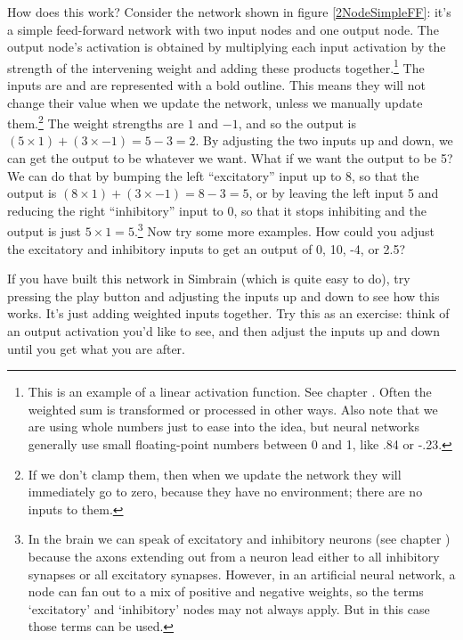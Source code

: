 How does this work? Consider the network shown in figure \ref{2NodeSimpleFF}: it's a simple feed-forward network with two input nodes and one output node. The output node's activation is obtained by multiplying each input activation by the strength of the intervening weight and adding these products together.\footnote{This is an example of a linear activation function. See chapter . Often the weighted sum is transformed or processed in other ways. Also note that we are using whole numbers just to ease into the idea, but neural networks generally use small floating-point numbers between 0 and 1, like .84 or -.23.}  The inputs are  and are represented with a bold outline. This means they will not change their value when we update the network, unless we manually update them.\footnote{If we don't clamp them, then when we update the network they will immediately go to zero, because they have no environment; there are no inputs to them.} The weight strengths are $1$ and $-1$, and so the output is $(5 \times 1) + (3 \times -1) = 5 - 3 = 2$. By adjusting the two inputs up and down, we can get the output to be whatever we want. What if we want the output to be 5? We can do that by bumping the left  ``excitatory'' input up to 8, so that the output is $(8 \times 1) + (3 \times -1) = 8 - 3 = 5$, or by leaving the left input 5 and reducing the right ``inhibitory'' input to 0, so that it stops inhibiting and the output is just $5 \times 1 = 5$.\footnote{In the brain we can speak of excitatory and inhibitory neurons (see chapter ) because the axons extending out from a neuron lead either to all inhibitory synapses or all excitatory synapses. However, in an artificial neural network, a node can fan out to a mix of positive and negative weights, so the terms `excitatory' and `inhibitory' nodes may not always apply. But in this case those terms can be used.} Now try some more examples. How could you adjust the excitatory and inhibitory inputs to get an output of 0, 10, -4, or 2.5?

If you have built this network in Simbrain (which is quite easy to do), try pressing the play button and adjusting the inputs up and down to see how this works. It's just adding weighted inputs together. Try this as an exercise: think of an output activation you'd like to see, and then adjust the inputs up and down until you get what you are after.

